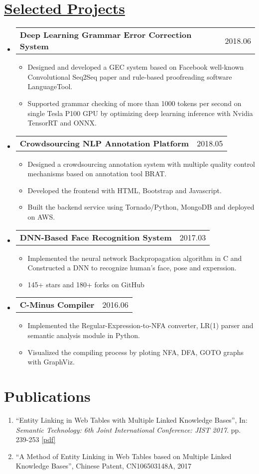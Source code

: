 \documentclass[letterpaper, 11pt]{article}
\makeatletter
\newcommand{\resumeSingleSubItem}[1]{
   \item\small{#1} \vspace{-3pt}
}
\newcommand{\projectSubheading}[2]{
  \vspace{-2pt}\item
    \begin{tabular*}{0.97\textwidth}[t]{l@{\extracolsep{\fill}}r}
      \textbf{#1} & #2 \\
    \end{tabular*}\vspace{-7pt}
}
\newcommand{\resumeSubHeadingListStart}{\begin{itemize}[leftmargin=*]}
\newcommand{\resumeSubHeadingListEnd}{\end{itemize}\vspace{-10pt}}
\newcommand{\resumeItemListStart}{\begin{itemize}[leftmargin=*]}
\newcommand{\resumeItemListEnd}{\end{itemize}\vspace{-5pt}}
\makeatother
\begin{document}
\section{\href{https://yanshengjia.com/projects}{Selected Projects}}
    \resumeSubHeadingListStart
        \projectSubheading{Deep Learning Grammar Error Correction System}{2018.06}
          \resumeItemListStart
            \resumeSingleSubItem{Designed and developed a GEC system based on Facebook well-known Convolutional Seq2Seq paper and rule-based proofreading software LanguageTool.}
            \resumeSingleSubItem{Supported grammar checking of more than 1000 tokens per second on single Tesla P100 GPU by optimizing deep learning inference with Nvidia TensorRT and ONNX.}
          \resumeItemListEnd
            
        \projectSubheading{Crowdsourcing NLP Annotation Platform}{2018.05}
          \resumeItemListStart
            \resumeSingleSubItem{Designed a crowdsourcing annotation system with multiple quality control mechanisms based on annotation tool BRAT.}
            \resumeSingleSubItem{Developed the frontend with HTML, Bootstrap and Javascript.}
            \resumeSingleSubItem{Built the backend service using Tornado/Python, MongoDB and deployed on AWS.}
          \resumeItemListEnd

        \projectSubheading{DNN-Based Face Recognition System}{2017.03}
          \resumeItemListStart
            \resumeSingleSubItem{Implemented the neural network Backpropagation algorithm in C and Constructed a DNN to recognize human's face, pose and experssion.}
            \resumeSingleSubItem{145+ stars and 180+ forks on GitHub}
          \resumeItemListEnd

        \projectSubheading{C-Minus Compiler}{2016.06}
          \resumeItemListStart
            \resumeSingleSubItem{Implemented the Regular-Expression-to-NFA converter, LR(1) parser and semantic analysis module in Python.}
            \resumeSingleSubItem{Visualized the compiling process by ploting NFA, DFA, GOTO graphs with GraphViz.}
          \resumeItemListEnd

    \resumeSubHeadingListEnd


\section{Publications}
    \begin{enumerate}[leftmargin=*, itemsep=0pt]
        \resumeSingleSubItem{``Entity Linking in Web Tables with Multiple Linked Knowledge Bases'', In: \textit{Semantic Technology: 6th Joint International Conference: JIST 2017}. pp. 239-253 \href{https://link.springer.com/chapter/10.1007/978-3-319-50112-3_18}{[pdf]}}
        \resumeSingleSubItem{``A Method of Entity Linking in Web Tables based on Multiple Linked Knowledge Bases'', Chinese Patent, CN106503148A, 2017} 
    \end{enumerate}\vspace{-10pt}
\end{document}
